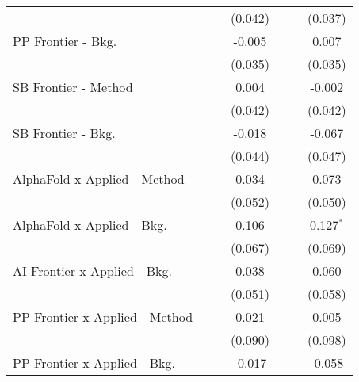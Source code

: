 \begin{tabular}{lcccccc}
                                  &               &               & (0.042)       &               &         & (0.037)\\   
   PP Frontier - Bkg.             &               &               & -0.005        &               &         & 0.007\\   
                                  &               &               & (0.035)       &               &         & (0.035)\\   
   SB Frontier - Method           &               &               & 0.004         &               &         & -0.002\\   
                                  &               &               & (0.042)       &               &         & (0.042)\\   
   SB Frontier - Bkg.             &               &               & -0.018        &               &         & -0.067\\   
                                  &               &               & (0.044)       &               &         & (0.047)\\   
   AlphaFold x Applied - Method   &               &               & 0.034         &               &         & 0.073\\   
                                  &               &               & (0.052)       &               &         & (0.050)\\   
   AlphaFold x Applied - Bkg.     &               &               & 0.106         &               &         & 0.127$^{*}$\\   
                                  &               &               & (0.067)       &               &         & (0.069)\\   
   AI Frontier x Applied - Bkg.   &               &               & 0.038         &               &         & 0.060\\   
                                  &               &               & (0.051)       &               &         & (0.058)\\   
   PP Frontier x Applied - Method &               &               & 0.021         &               &         & 0.005\\   
                                  &               &               & (0.090)       &               &         & (0.098)\\   
   PP Frontier x Applied - Bkg.   &               &               & -0.017        &               &         & -0.058\\   

\end{tabular}
